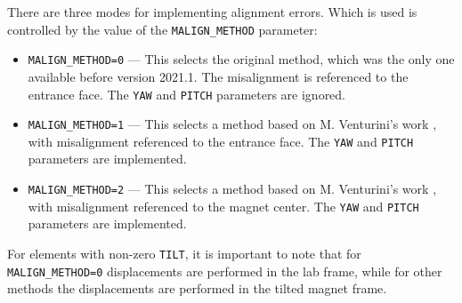 There are three modes for implementing alignment errors. Which is used
is controlled by the value of the \verb|MALIGN_METHOD| parameter:
\begin{itemize}
\item \verb|MALIGN_METHOD=0| --- This selects the original method, which was
  the only one available before version 2021.1. The misalignment is
  referenced to the entrance face. The \verb|YAW| and \verb|PITCH| parameters
  are ignored.
\item \verb|MALIGN_METHOD=1| --- This selects a method based on M. Venturini's
  work \cite{Venturini2021}, with misalignment referenced to the entrance face.
  The \verb|YAW| and \verb|PITCH| parameters are implemented.
\item \verb|MALIGN_METHOD=2| --- This selects a method based on M. Venturini's
  work \cite{Venturini2021}, with misalignment referenced to the magnet center.
  The \verb|YAW| and \verb|PITCH| parameters are implemented.
\end{itemize}

For elements with non-zero \verb|TILT|,  it is important to note that for \verb|MALIGN_METHOD=0|
displacements are performed in the lab frame, while for other methods the displacements are
performed in the tilted magnet frame.
